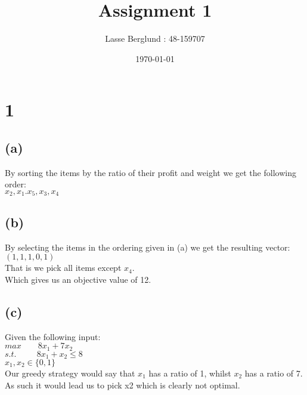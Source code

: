 \documentclass[12pt]{report}
\title{Assignment 1}
\author{Lasse Berglund : 48-159707}
\date{\today}
\begin{document}
\maketitle
\section*{1}
\subsection*{(a)}
By sorting the items by the ratio of their profit and weight we get the following order: \\

$x_2,x_1.x_5,x_3,x_4$

\subsection*{(b)}
By selecting the items in the ordering given in (a) we get the resulting vector: \\
$(1,1,1,0,1)$ \\
That is we pick all items except $x_4$. \\
Which gives us an objective value of 12.

\subsection*{(c)}
Given the following input: \\
$max  \qquad 8x_1 + 7x_2$ \\
$s.t.\  \ \qquad 8x_1 + x_2 \le 8$ \\
$x_1,x_2 \in \{0,1\}$ \\

Our greedy strategy would say that $x_1$ has a ratio of 1, whilst $x_2$ has a ratio of 7. As such it would lead us to pick x2 which is clearly not optimal.


\newpage
\end{document}
